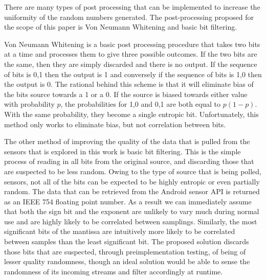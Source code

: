 

There are many types of post processing that can be implemented to increase the
uniformity of the random numbers generated. The post-processing proposed for the
scope of this paper is Von Neumann Whitening \cite{vn_whitening} and basic bit
filtering. 

Von Neumann Whitening is a basic post processing procedure that takes two bits
at a time and processes them to give three possible outcomes. If the two bits
are the same, then they are simply discarded and there is no output. If the
sequence of bits is 0,1 then the output is 1 and conversely if the sequence of
bits is 1,0 then the output is 0. The rational behind this scheme is that it
will eliminate bias of the bits source towards a 1 or a 0. If the source is
biased towards either value with probability $p$, the probabilities for 1,0
and 0,1 are both equal to $p(1-p)$. With the same probability, they become a
single entropic bit. Unfortunately, this method only works to eliminate bias,
but not correlation between bits.

The other method of improving the quality of the data that is pulled from the
sensors that is explored in this work is basic bit filtering. This is the simple
process of reading in all bits from the original source, and discarding those
that are suspected to be less random. Owing to the type of source that is being
polled, sensors, not all of the bits can be expected to be highly entropic or
even partially random. The data that can be retrieved from the Android sensor
API is returned as an IEEE 754 floating point number. As a result we can
immediately assume that both the sign bit and the exponent are unlikely to vary
much during normal use and are highly likely to be correlated between samplings.
Similarly, the most significant bits of the mantissa are intuitively more likely
to be correlated between samples than the least significant bit. The proposed
solution discards those bits that are suspected, through preimplementation
testing, of being of lesser quality randomness, though an ideal solution would
be able to sense the randomness of its incoming streams and filter accordingly
at runtime.
 
